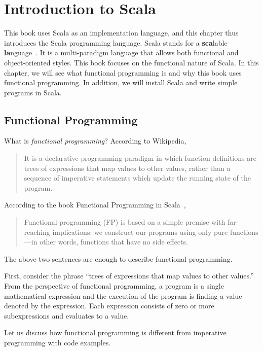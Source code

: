 \setchapterpreamble[u]{\margintoc}
\chapter{Introduction to Scala}

This book uses Scala as an implementation language, and
this chapter thus introduces the Scala programming language. Scala stands for a
\textbf{sca}lable \textbf{la}nguage~\cite{programming-in-scala}. It is a
multi-paradigm language that allows both functional and object-oriented styles.
This book focuses on the functional nature of Scala. In this chapter, we will
see what functional programming is and why this book uses functional
programming. In addition, we will install Scala and write simple programs in
Scala.

\section{Functional Programming}

What is \textit{functional programming}?
According to Wikipedia,

\begin{quote}
It is a declarative programming paradigm in which function definitions are trees
of expressions that map values to other values, rather than a sequence of
imperative statements which update the running state of the program.
\end{quote}

According to the book Functional Programming in Scala~\cite{fp-in-scala},

\begin{quote}
Functional programming (FP) is based on a simple premise with far-reaching
implications: we construct our programs using only pure functions---in other words,
functions that have no side effects.
\end{quote}

The above two sentences are enough to describe functional programming.

First, consider the phrase ``trees of expressions that map values to other
values.''
From the perspective of functional programming, a
program is a single mathematical expression and the execution of the program is
finding a value denoted by the expression.
Each expression consists of zero or more subexpressions and evaluates to a value.

Let us discuss how
functional programming is different from imperative programming with
code examples.

